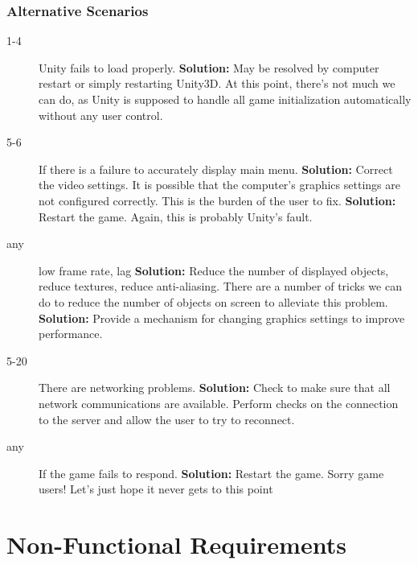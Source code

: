 \documentclass[10pt,letterpaper,oneside,english]{article}
\newcommand{\solution}{\newline \hspace*{1em} \textbf{Solution: }}
\begin{document}
\subsubsection{Alternative Scenarios}
\begin{description}
\item[1-4] Unity fails to load properly.
\solution{May be resolved by computer restart or simply restarting Unity3D. At this point, there’s not much we can do, as Unity is supposed to handle all game initialization automatically without any user control.}
\item[5-6] If there is a failure to accurately display main menu.
\solution{Correct the video settings. It is possible that the computer’s graphics settings are not configured correctly. This is the burden of the user to fix.}
\solution{Restart the game. Again, this is probably Unity’s fault.}
\item[any] low frame rate, lag
\solution{Reduce the number of displayed objects, reduce textures, reduce anti-aliasing. There are a number of tricks we can do to reduce the number of objects on screen to alleviate this problem.}
\solution{Provide a mechanism for changing graphics settings to improve performance.}
\item[5-20] There are networking problems.
\solution{Check to make sure that all network communications are available. Perform checks on the connection to the server and allow the user to try to reconnect.}
\item[any] If the game fails to respond.
		\solution{Restart the game. Sorry game users! Let’s just hope it never gets to this point \textellipsis}

\end{description}



\section{Non-Functional Requirements}
\end{document}
